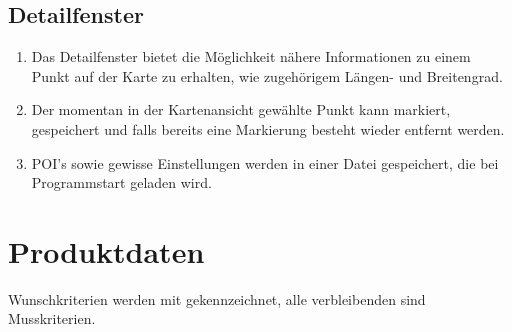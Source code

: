 \documentclass[10pt]{scrreprt}
\begin{document}
\section{Detailfenster}
\begin{enumerate}[leftmargin=2.5cm,resume]
\item Das Detailfenster bietet die Möglichkeit nähere Informationen zu einem Punkt auf der Karte zu erhalten, wie zugehörigem Längen- und Breitengrad.
\wunsch
\item Der momentan in der Kartenansicht gewählte Punkt kann markiert,  gespeichert und falls bereits eine Markierung besteht wieder entfernt werden.
\item POI's sowie gewisse Einstellungen werden in einer Datei gespeichert, die bei Programmstart geladen wird.
\end{enumerate}



\chapter{Produktdaten}

\renewcommand{\muss}{\renewcommand{\labelenumi}{\textbf{/D\numprint{\theenumi}0/}}}
\renewcommand{\wunsch}{\renewcommand{\labelenumi}{\textbf{/D\numprint{\theenumi}0W/}}}
\muss

Wunschkriterien werden mit \W  gekennzeichnet, alle verbleibenden sind Musskriterien.\\

\vspace{5mm}
\end{document}
